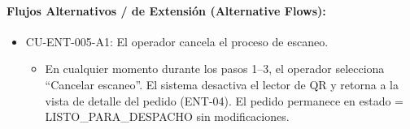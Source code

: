\paragraph{Flujos Alternativos / de Extensión (Alternative Flows):}
\begin{itemize}
    \item CU-ENT-005-A1: El operador cancela el proceso de escaneo.
    \begin{itemize}
        \item En cualquier momento durante los pasos 1--3, el operador selecciona ``Cancelar escaneo''. El sistema desactiva el lector de QR y retorna a la vista de detalle del pedido (ENT-04). El pedido permanece en estado = LISTO\_PARA\_DESPACHO sin modificaciones.
    \end{itemize}
\end{itemize}

